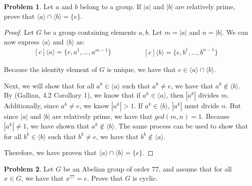 \documentclass[12pt,reqno]{article}
\theoremstyle{plain}
\theoremstyle{definition}
\newtheorem{problem}{Problem}
\begin{document}
\newpage


\begin{problem}
    Let \(a\) and \(b\) belong to a group. If \(|a|\) and \(|b|\) are relatively prime, prove that \(\langle a\rangle \cap \langle b\rangle = \{e\}\).
\end{problem}

\begin{proof}
    Let \(G\) be a group containing elements \(a,b\). Let \(m=|a|\) and \(n=|b|\). We can now express \(\langle a\rangle\) and \(\langle b\rangle\) as:
    \begin{equation*}
        \begin{aligned}[c]
            \langle a\rangle = \{e,a^1,\ldots,a^{m-1}\}
        \end{aligned}
        \qquad\qquad
        \begin{aligned}[c]
            \langle b\rangle = \{e,b^1,\ldots,b^{n-1}\}
        \end{aligned}
    \end{equation*}
    
    Because the identity element of \(G\) is unique, we have that \(e\in\langle a\rangle\cap\langle b\rangle\).
    
    Next, we will show that for all \(a^k\in\langle a\rangle\) such that \(a^k\neq e\), we have that \(a^k\notin\langle b\rangle\).
    By (Gallian, 4.2 Corollary 1), we know that if \(a^k\in\langle a\rangle\), then \(|a^k|\) divides \(m\). Additionally, since \(a^k\neq e\),
    we know \(|a^k|>1\). If \(a^k\in\langle b\rangle\), \(|a^k|\) must divide \(n\). But since \(|a|\) and \(|b|\) are relatively prime, we have that \(gcd(m,n)=1\). Because
    \(|a^k|\neq 1\), we have shown that \(a^k\notin\langle b\rangle\). The same process can be used to show that for all \(b^k\in\langle b\rangle\) such that \(b^k\neq e\),
    we have that \(b^k\notin\langle a\rangle\).

    Therefore, we have proven that \(\langle a\rangle\cap\langle b\rangle=\{e\}\).
\end{proof}

\newpage


\begin{problem}
    Let \(G\) be an Abelian group of order \(77\), and assume that for all \(x\in G\), we have that
    \(x^{77}=e\). Prove that \(G\) is cyclic.
\end{problem}
\end{document}
